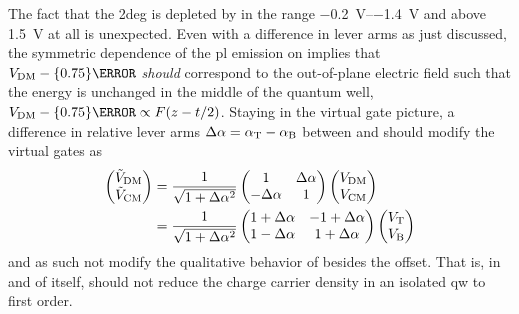 The fact that the \gls{2deg} is depleted by \VDM in the range \qtyrange{-0.2}{-1.4}{\volt} and above \qty{1.5}{\volt} at all is unexpected.
Even with a difference in lever arms as just discussed, the symmetric dependence of the \gls{pl} emission on \VDM implies that $\VDM - \qty{0.75}{\volt}$ \emph{should} correspond to the out-of-plane electric field such that the energy is unchanged in the middle of the quantum well, $\VDM - \qty{0.75}{\volt} \propto F(z-t/2)$.
Staying in the virtual gate picture, a difference in relative lever arms
$\Delta\alpha = \alpha_{\mathrm{T}} - \alpha_{\mathrm{B}}$ between \VT and \VB should modify the virtual gates as
\begin{align}\label{eq:exp:virtual_gates}
    \begin{pmatrix}
        \tilde{V}_{\mathrm{DM}} \\
        \tilde{V}_{\mathrm{CM}}
    \end{pmatrix}
    &= \frac{1}{\sqrt{1 + \Delta\alpha^2}}\begin{pmatrix}
        1 & \Delta\alpha \\
        -\Delta\alpha & 1
    \end{pmatrix}\begin{pmatrix}
        V_{\mathrm{DM}} \\
        V_{\mathrm{CM}}
    \end{pmatrix} \\
    &= \frac{1}{\sqrt{1 + \Delta\alpha^2}}\begin{pmatrix}
        1 + \Delta\alpha & -1 + \Delta\alpha \\
         1 - \Delta\alpha & 1 + \Delta\alpha
    \end{pmatrix}\begin{pmatrix}
        V_{\mathrm{T}} \\
        V_{\mathrm{B}}
    \end{pmatrix}
\end{align}
and as such not modify the qualitative behavior of \VDM besides the offset.
That is, in and of itself, \VDM should not reduce the charge carrier density in an isolated \gls{qw} to first order.

